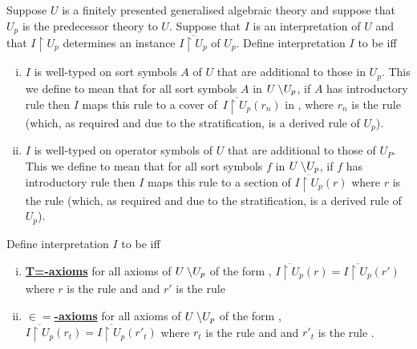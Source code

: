 \def\restrict{\mathbin{\restriction}}
\newcommand{\predInstance}{\overline{I \restrict U_p}}
\newcommand{\Uincrement}{U \setminus\kern-2pt U_p}

\begin{definition}
Suppose $U$ is a finitely presented generalised algebraic theory and 
suppose that $U_p$ is the predecessor theory to $U$. Suppose that $I$ is an interpretation of $U$  and that  $I \restrict U_p$  
determines an instance $\predInstance$ of $U_p$.
Define interpretation $I$ to be   iff 

\begin{enumerate}[(i)]
\item
$I$ is well-typed on sort symbols $A$ of $U$ that are additional to those in $U_p$. This we define to mean that
for all sort symbols $A$ in $\Uincrement$, if $A$ has introductory rule 
\genericAintroductoryrule then $I$ maps this rule to a cover of \,$\predInstance(r_n)$ in \catc, where $r_n$ is the rule 
 (which, as required and due to the stratification, is a derived rule of $U_p$).
\item  $I$ is well-typed on operator symbols  of $U$ that are additional to those of $U_P$. This we define to mean that
for all sort symbols $f$ in $\Uincrement$, if $f$ has introductory rule 
\genericfintroductoryrule then $I$ maps this rule to a section 
of $\predInstance(r)$ where $r$ is the rule
 (which, as required and due to the stratification, is a derived rule of $U_p$). 
\end{enumerate}

Define interpretation $I$ to be   iff  
\begin{enumerate}[(i)]
\item \underline{\textbf{T=-axioms}} 
for all axioms of $\Uincrement$ of the form
 ,
$\predInstance(r) = \predInstance(r')$ where $r$ is the rule
 and  
and $r'$ is the rule 
\item \underline{\textbf{$\boldsymbol{\in=}$-axioms}} 
for all axioms of $\Uincrement$ of the form 
,
$\predInstance(r_t) = \predInstance(r'_t)$ where $r_t$ is the rule
 and  
and $r'_t$ is the rule .
\end{enumerate}
\end{definition}

